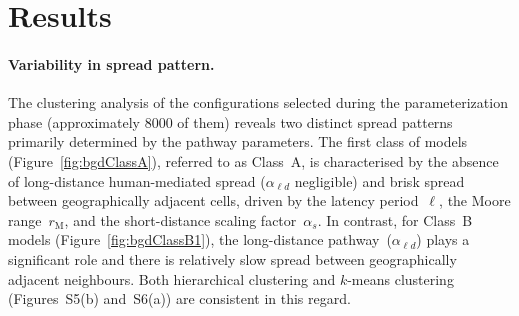 \documentclass[11pt]{article}
\newcommand{\asd}{\alpha_s}
\newcommand{\ald}{\alpha_{\ell d}}
\newcommand{\mooreRange}{r_\mathrm{M}}
\theoremstyle{definition}
\begin{document}
\section{Results}
\paragraph{Variability in spread pattern.} The clustering analysis of the
configurations selected during the parameterization phase (approximately
8000 of them) reveals two distinct spread patterns primarily determined by
the pathway parameters.  The first class of models
(Figure~\ref{fig:bgdClassA}), referred to as Class~A, is characterised by
the absence of long-distance human-mediated spread ($\ald$ negligible) and
brisk spread between geographically adjacent cells, driven by the latency
period~$\ell$, the Moore range~$\mooreRange$, and the short-distance scaling
factor~$\asd$. In contrast, for Class~B models
(Figure~\ref{fig:bgdClassB1}), the long-distance pathway~($\ald$) plays a
significant role  and there is relatively slow spread between
geographically adjacent neighbours. Both hierarchical clustering and
$k$-means clustering (Figures~S5(b) and~S6(a)) are consistent in this
regard.
\end{document}
